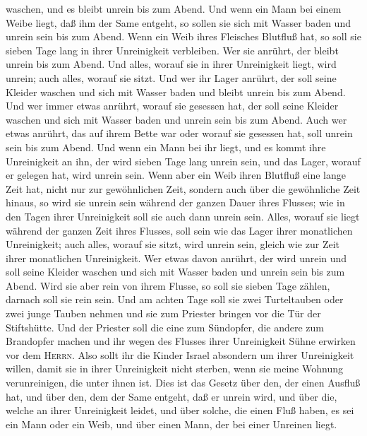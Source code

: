 waschen, und es bleibt unrein bis zum Abend.  Und wenn
ein Mann bei einem Weibe liegt, daß ihm der Same entgeht, so sollen sie
sich mit Wasser baden und unrein sein bis zum Abend. 
Wenn ein Weib ihres Fleisches Blutfluß hat, so soll sie sieben Tage lang
in ihrer Unreinigkeit verbleiben. Wer sie anrührt, der bleibt unrein bis
zum Abend.  Und alles, worauf sie in ihrer Unreinigkeit
liegt, wird unrein; auch alles, worauf sie sitzt.  Und
wer ihr Lager anrührt, der soll seine Kleider waschen und sich mit
Wasser baden und bleibt unrein bis zum Abend.  Und wer
immer etwas anrührt, worauf sie gesessen hat, der soll seine Kleider
waschen und sich mit Wasser baden und unrein sein bis zum Abend.
 Auch wer etwas anrührt, das auf ihrem Bette war oder
worauf sie gesessen hat, soll unrein sein bis zum Abend. 
Und wenn ein Mann bei ihr liegt, und es kommt ihre Unreinigkeit an ihn,
der wird sieben Tage lang unrein sein, und das Lager, worauf er gelegen
hat, wird unrein sein.  Wenn aber ein Weib ihren Blutfluß
eine lange Zeit hat, nicht nur zur gewöhnlichen Zeit, sondern auch über
die gewöhnliche Zeit hinaus, so wird sie unrein sein während der ganzen
Dauer ihres Flusses; wie in den Tagen ihrer Unreinigkeit soll sie auch
dann unrein sein.  Alles, worauf sie liegt während der
ganzen Zeit ihres Flusses, soll sein wie das Lager ihrer monatlichen
Unreinigkeit; auch alles, worauf sie sitzt, wird unrein sein, gleich wie
zur Zeit ihrer monatlichen Unreinigkeit.  Wer etwas davon
anrührt, der wird unrein und soll seine Kleider waschen und sich mit
Wasser baden und unrein sein bis zum Abend.  Wird sie
aber rein von ihrem Flusse, so soll sie sieben Tage zählen, darnach soll
sie rein sein.  Und am achten Tage soll sie zwei
Turteltauben oder zwei junge Tauben nehmen und sie zum Priester bringen
vor die Tür der Stiftshütte.  Und der Priester soll die
eine zum Sündopfer, die andere zum Brandopfer machen und ihr wegen des
Flusses ihrer Unreinigkeit Sühne erwirken vor dem \textsc{Herrn}.
 Also sollt ihr die Kinder Israel absondern um ihrer
Unreinigkeit willen, damit sie in ihrer Unreinigkeit nicht sterben, wenn
sie meine Wohnung verunreinigen, die unter ihnen ist. 
Dies ist das Gesetz über den, der einen Ausfluß hat, und über den, dem
der Same entgeht, daß er unrein wird,  und über die,
welche an ihrer Unreinigkeit leidet, und über solche, die einen Fluß
haben, es sei ein Mann oder ein Weib, und über einen Mann, der bei einer
Unreinen liegt.

